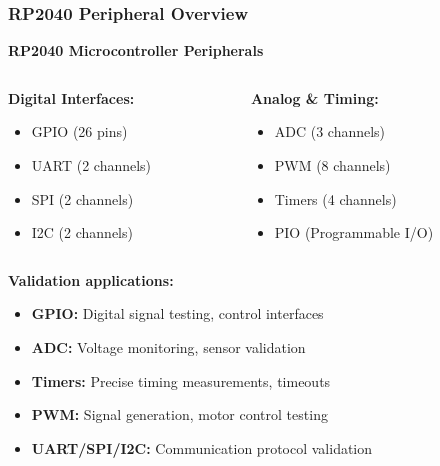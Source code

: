 \documentclass{beamer}
\begin{document}
\begin{frame}
\frametitle{RP2040 Peripheral Overview}

\begin{center}
\textbf{RP2040 Microcontroller Peripherals}
\end{center}

\begin{columns}
\begin{column}{0.5\textwidth}
\textbf{Digital Interfaces:}
\begin{itemize}
    \item GPIO (26 pins)
    \item UART (2 channels)
    \item SPI (2 channels)
    \item I2C (2 channels)
\end{itemize}
\end{column}
\begin{column}{0.5\textwidth}
\textbf{Analog \& Timing:}
\begin{itemize}
    \item ADC (3 channels)
    \item PWM (8 channels)
    \item Timers (4 channels)
    \item PIO (Programmable I/O)
\end{itemize}
\end{column}
\end{columns}

\vspace{0.5cm}
\textbf{Validation applications:}
\begin{itemize}
    \item \textbf{GPIO:} Digital signal testing, control interfaces
    \item \textbf{ADC:} Voltage monitoring, sensor validation
    \item \textbf{Timers:} Precise timing measurements, timeouts
    \item \textbf{PWM:} Signal generation, motor control testing
    \item \textbf{UART/SPI/I2C:} Communication protocol validation
\end{itemize}
\end{frame}
\end{document}
